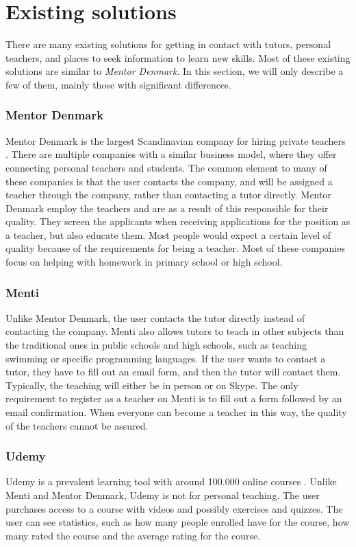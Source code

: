 \section{Existing solutions}
There are many existing solutions for getting in contact with tutors, personal teachers, and places to seek information to learn new skills.
Most of these existing solutions are similar to \textit{Mentor Denmark}.  
In this section, we will only describe a few of them, mainly those with significant differences.

\subsubsection{Mentor Denmark}
Mentor Denmark is the largest Scandinavian company for hiring private teachers \cite{skandinaviens-stoeste-lektiefirma}.
There are multiple companies with a similar business model, where they offer connecting personal teachers and students.
The common element to many of these companies is that the user contacts the company, and will be assigned a teacher through the company, rather than contacting a tutor directly.
Mentor Denmark employ the teachers and are as a result of this responsible for their quality. 
They screen the applicants when receiving applications for the position as a teacher, but also educate them.
Most people would expect a certain level of quality because of the requirements for being a teacher.
Most of these companies focus on helping with homework in primary school or high school.

\subsubsection{Menti}
Unlike Mentor Denmark, the user contacts the tutor directly instead of contacting the company.
Menti also allows tutors to teach in other subjects than the traditional ones in public schools and high schools, such as teaching swimming or specific programming languages. 
If the user wants to contact a tutor, they have to fill out an email form, and then the tutor will contact them.
Typically, the teaching will either be in person or on Skype.
The only requirement to register as a teacher on Menti is to fill out a form followed by an email confirmation.
When everyone can become a teacher in this way, the quality of the teachers cannot be assured.

\subsubsection{Udemy}
Udemy is a prevalent learning tool with around 100.000 online courses \cite{udemy}.
Unlike Menti and Mentor Denmark, Udemy is not for personal teaching. 
The user purchases access to a course with videos and possibly exercises and quizzes. 
The user can see statistics, such as how many people enrolled have for the course, how many rated the course and the average rating for the course.

